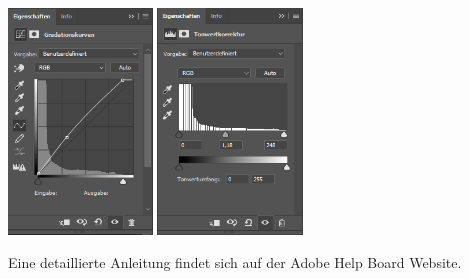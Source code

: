 \documentclass[notoc, landscape]{school}
\begin{document}
\begin{minipage}{.35\textwidth}~\\\\\\
\begin{center}
\includegraphics[height=6cm]{retusche-02-grad.png}
\includegraphics[height=6cm]{retusche-03-tonwert.png}
\end{center}
\end{minipage}
\vfill
Eine detaillierte Anleitung findet sich auf der Adobe Help Board Website\cite{adobe-quick-adjustments}.
\newpage
\end{document}
